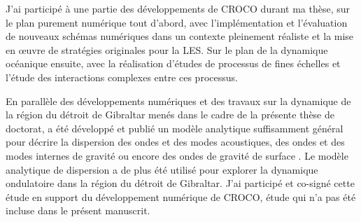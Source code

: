 
J'ai participé à une partie des développements de CROCO durant ma thèse, sur le plan purement numérique tout d'abord, avec l'implémentation et l'évaluation de nouveaux schémas numériques dans un contexte pleinement réaliste et la mise en œuvre de stratégies originales pour la LES. Sur le plan de la dynamique océanique ensuite, avec la réalisation d'études de processus de fines échelles et l'étude des interactions complexes entre ces processus.


En parallèle des développements numériques et des travaux sur la dynamique de la région du détroit de Gibraltar menés dans le cadre de la présente thèse de doctorat, a été développé et publié un modèle analytique suffisamment général pour décrire la dispersion des ondes et des modes acoustiques, des ondes et des modes internes de gravité ou encore des ondes de gravité de surface \citep{auclair_modied_2021}. Le modèle analytique de dispersion a de plus été utilisé pour explorer la dynamique ondulatoire dans la région du détroit de Gibraltar.
J'ai participé et co-signé cette étude en support du développement numérique de CROCO, étude qui n'a pas été incluse dans le présent manuscrit.




